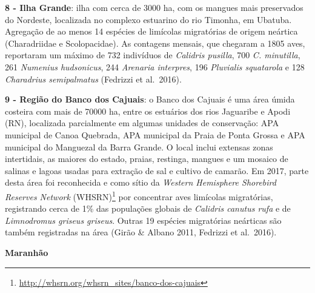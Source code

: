 \documentclass[
  oneside]{scrbook}
\DeclareRobustCommand{\href}[2]{#2\footnote{\url{#1}}}
\begin{document}
\textbf{8 - Ilha Grande}: ilha com cerca de 3000 ha, com os mangues mais preservados do Nordeste, localizada no complexo estuarino do rio Timonha, em Ubatuba. Agregação de ao menos 14 espécies de limícolas migratórias de origem neártica (Charadriidae e Scolopacidae). As contagens mensais, que chegaram a 1805 aves, reportaram um máximo de 732 indivíduos de \emph{Calidris pusilla}, 700 \emph{C. minutilla}, 261 \emph{Numenius hudsonicus}, 244 \emph{Arenaria interpres}, 196 \emph{Pluvialis squatarola} e 128 \emph{Charadrius semipalmatus} (Fedrizzi et al.~2016).

\textbf{9 - Região do Banco dos Cajuais}: o Banco dos Cajuais é uma área úmida costeira com mais de 70000 ha, entre os estuários dos rios Jaguaribe e Apodi (RN), localizada parcialmente em algumas unidades de conservação: APA municipal de Canoa Quebrada, APA municipal da Praia de Ponta Grossa e APA municipal do Manguezal da Barra Grande. O local inclui extensas zonas intertidais, as maiores do estado, praias, restinga, mangues e um mosaico de salinas e lagoas usadas para extração de sal e cultivo de camarão. Em 2017, parte desta área foi reconhecida e como \href{http://whsrn.org/whsrn_sites/banco-dos-cajuais}{sítio da \emph{Western Hemisphere Shorebird Reserves Network} (WHSRN)} por concentrar aves limícolas migratórias, registrando cerca de 1\% das populações globais de \emph{Calidris canutus rufa} e de \emph{Limnodromus griseus griseus}. Outras 19 espécies migratórias neárticas são também registradas na área (Girão \& Albano 2011, Fedrizzi et al.~2016).

\textbf{Maranhão}
\end{document}
